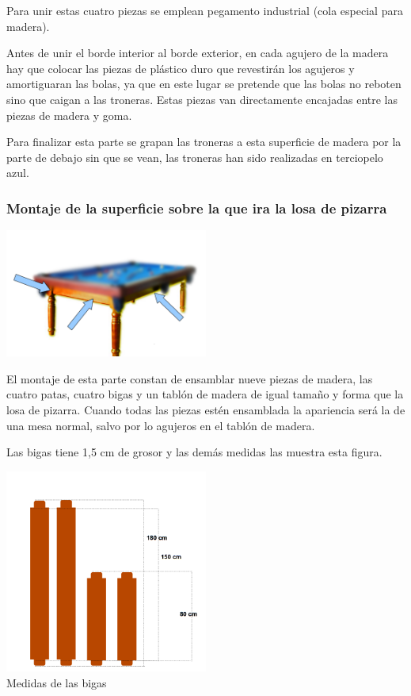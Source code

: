 Para unir estas cuatro piezas se emplean pegamento industrial (cola especial para madera).
 
Antes de unir el borde interior al borde exterior, en cada agujero de la madera hay que colocar las piezas de plástico duro que revestirán los agujeros y amortiguaran las bolas, ya que en este 
lugar se pretende que las bolas no reboten sino que caigan a las troneras.  Estas piezas van directamente encajadas entre las piezas de madera y goma.  

Para finalizar esta parte se grapan las troneras a esta superficie de madera por la parte de debajo sin que se vean, las troneras han sido realizadas en terciopelo azul.


\subsubsection {Montaje de la superficie sobre la que ira la losa de pizarra}

\begin{center}
    		\includegraphics[width=0.5\textwidth]{billar2.png}
	\end{center}


El montaje de esta parte constan de ensamblar nueve piezas de madera, las cuatro patas,  cuatro bigas y un tablón de madera de igual tamaño y forma que la losa de pizarra.
Cuando todas las piezas estén ensamblada la apariencia será la de una mesa normal, salvo por lo agujeros en el tablón de  madera.

Las bigas tiene 1,5 cm de grosor y las demás medidas las muestra esta figura.

\begin{center}
    		\includegraphics[width=0.5\textwidth]{bigas.png}
		 \\ \small {Medidas de las bigas}
	\end{center}

